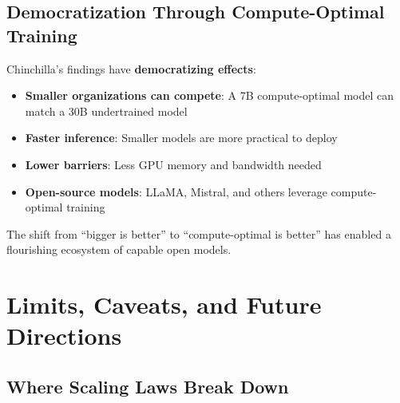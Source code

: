 \documentclass{article}
\begin{document}
\subsection{Democratization Through Compute-Optimal Training}

Chinchilla's findings have \textbf{democratizing effects}:

\begin{itemize}
\item \textbf{Smaller organizations can compete}: A 7B compute-optimal model can match a 30B undertrained model
\item \textbf{Faster inference}: Smaller models are more practical to deploy
\item \textbf{Lower barriers}: Less GPU memory and bandwidth needed
\item \textbf{Open-source models}: LLaMA, Mistral, and others leverage compute-optimal training
\end{itemize}

The shift from ``bigger is better'' to ``compute-optimal is better'' has enabled a flourishing ecosystem of capable open models.

\section{Limits, Caveats, and Future Directions}

\subsection{Where Scaling Laws Break Down}
\end{document}
